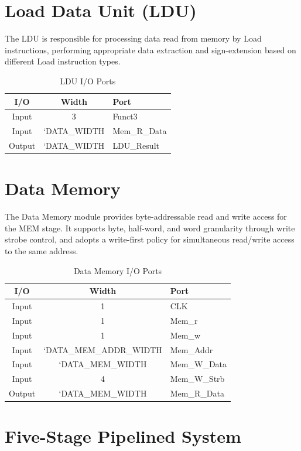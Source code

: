 \documentclass[12pt,a4paper]{report}
\begin{document}
\section{Load Data Unit (LDU)}

The LDU is responsible for processing data read from memory by Load instructions, performing appropriate data extraction and sign-extension based on different Load instruction types.

\begin{table}[htbp]
\centering
\caption{LDU I/O Ports}
\begin{tabular}{|c|c|l|}
\hline
\textbf{I/O} & \textbf{Width} & \textbf{Port} \\
\hline
Input & 3 & Funct3 \\
Input & `DATA\_WIDTH & Mem\_R\_Data \\
Output & `DATA\_WIDTH & LDU\_Result \\
\hline
\end{tabular}
\end{table}

\section{Data Memory}

The Data Memory module provides byte-addressable read and write access for the MEM stage. It supports byte, half-word, and word granularity through write strobe control, and adopts a write-first policy for simultaneous read/write access to the same address.

\begin{table}[htbp]
\centering
\caption{Data Memory I/O Ports}
\begin{tabular}{|c|c|l|}
\hline
\textbf{I/O} & \textbf{Width} & \textbf{Port} \\
\hline
Input & 1 & CLK \\
Input & 1 & Mem\_r \\
Input & 1 & Mem\_w \\
Input & `DATA\_MEM\_ADDR\_WIDTH & Mem\_Addr \\
Input & `DATA\_MEM\_WIDTH & Mem\_W\_Data \\
Input & 4 & Mem\_W\_Strb \\
Output & `DATA\_MEM\_WIDTH & Mem\_R\_Data \\
\hline
\end{tabular}
\end{table}

\section{Five-Stage Pipelined System}
\end{document}
